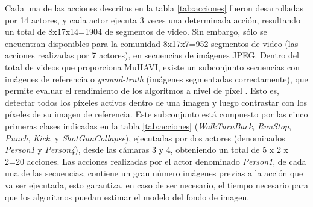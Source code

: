  Cada una de las acciones descritas en la tabla \ref{tab:acciones} fueron desarrolladas por 14 actores, y cada actor ejecuta 3 veces una determinada acción, resultando un total de 8x17x14=1904 de segmentos de video. Sin embargo, sólo se encuentran disponibles para la comunidad 8x17x7=952 segmentos de video (las acciones realizadas por 7 actores), en secuencias de imágenes JPEG. Dentro del total de videos que proporciona MuHAVI, existe un subconjunto secuencias con imágenes de referencia o \textit{ground-truth} (imágenes segmentadas correctamente), que permite evaluar el rendimiento de los algoritmos a nivel de píxel . Esto es, detectar todos los píxeles activos dentro de una imagen y luego contrastar con los píxeles de su imagen de referencia. Este subconjunto está compuesto por las cinco primeras clases indicadas en la tabla \ref{tab:acciones} (\textit{WalkTurnBack}, \textit{RunStop}, \textit{Punch}, \textit{Kick}, y \textit{ShotGunCollapse}), ejecutadas por dos actores (denominados \textit{Person1} y \textit{Person4}), desde las cámaras 3 y 4, obteniendo un total de  5 x 2 x 2=20 acciones. Las acciones realizadas por el actor denominado \textit{Person1}, de cada una de las secuencias, contiene un gran número imágenes previas a la acción que va ser ejecutada, esto garantiza, en caso de ser necesario, el tiempo necesario para que los algoritmos puedan estimar el modelo del fondo de imagen.

\begin{table}
\centering
{}
\caption[Tabla de acciones humanas definidas en MuHAVI]{Tabla que describe el total de acciones humanas contenidas en MuHAVI}
\label{tab:acciones}
\end{table}

